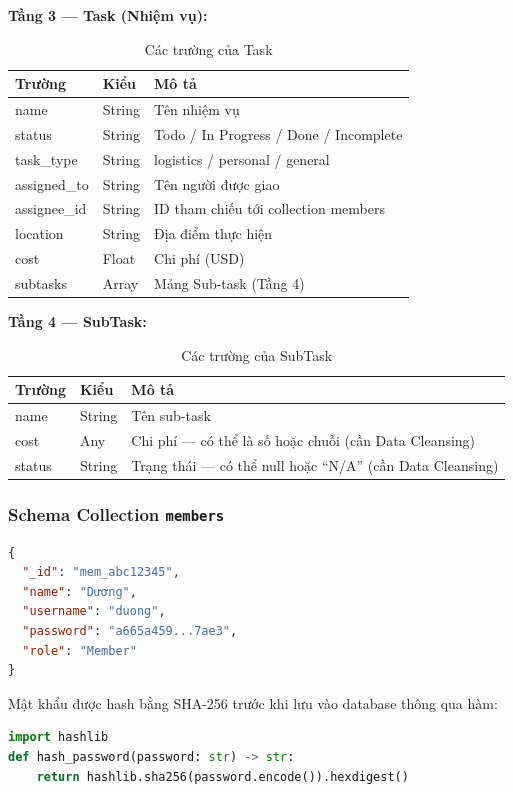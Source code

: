 \documentclass[a4paper,12pt]{article}
\begin{document}
\textbf{Tầng 3 --- Task (Nhiệm vụ):}
\begin{table}[H]
\centering
\begin{tabular}{|l|l|p{6cm}|}
\hline
\textbf{Trường} & \textbf{Kiểu} & \textbf{Mô tả} \\ \hline
name & String & Tên nhiệm vụ \\ \hline
status & String & Todo / In Progress / Done / Incomplete \\ \hline
task\_type & String & logistics / personal / general \\ \hline
assigned\_to & String & Tên người được giao \\ \hline
assignee\_id & String & ID tham chiếu tới collection members \\ \hline
location & String & Địa điểm thực hiện \\ \hline
cost & Float & Chi phí (USD) \\ \hline
subtasks & Array & Mảng Sub-task (Tầng 4) \\ \hline
\end{tabular}
\caption{Các trường của Task}
\end{table}

\textbf{Tầng 4 --- SubTask:}
\begin{table}[H]
\centering
\begin{tabular}{|l|l|p{6.5cm}|}
\hline
\textbf{Trường} & \textbf{Kiểu} & \textbf{Mô tả} \\ \hline
name & String & Tên sub-task \\ \hline
cost & Any & Chi phí --- có thể là số hoặc chuỗi (cần Data Cleansing) \\ \hline
status & String & Trạng thái --- có thể null hoặc ``N/A'' (cần Data Cleansing) \\ \hline
\end{tabular}
\caption{Các trường của SubTask}
\end{table}

\subsubsection{Schema Collection \texttt{members}}
\begin{lstlisting}[language=json, caption=Cấu trúc document trong collection members]
{
  "_id": "mem_abc12345",
  "name": "Dương",
  "username": "duong",
  "password": "a665a459...7ae3",
  "role": "Member"
}
\end{lstlisting}

Mật khẩu được hash bằng SHA-256 trước khi lưu vào database thông qua hàm:
\begin{lstlisting}[language=Python, caption=Hàm hash mật khẩu]
import hashlib
def hash_password(password: str) -> str:
    return hashlib.sha256(password.encode()).hexdigest()
\end{lstlisting}
\end{document}
